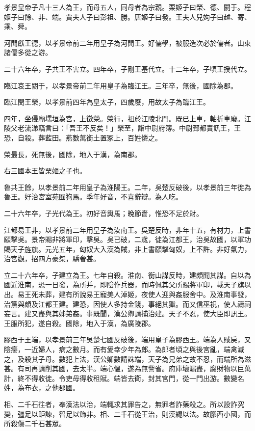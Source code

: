 
\begin{pinyinscope}
孝景皇帝子凡十三人為王，而母五人，同母者為宗親。栗姬子曰榮、德、閼于。程姬子曰餘、非、端。賈夫人子曰彭祖、勝。唐姬子曰發。王夫人兒姁子曰越、寄、乘、舜。

河閒獻王德，以孝景帝前二年用皇子為河閒王。好儒學，被服造次必於儒者。山東諸儒多從之游。

二十六年卒，子共王不害立。四年卒，子剛王基代立。十二年卒，子頃王授代立。

臨江哀王閼于，以孝景帝前二年用皇子為臨江王。三年卒，無後，國除為郡。

臨江閔王榮，以孝景前四年為皇太子，四歲廢，用故太子為臨江王。

四年，坐侵廟壖垣為宮，上徵榮。榮行，祖於江陵北門。既已上車，軸折車廢。江陵父老流涕竊言曰：「吾王不反矣！」榮至，詣中尉府簿。中尉郅都責訊王，王恐，自殺。葬藍田。燕數萬銜土置冢上，百姓憐之。

榮最長，死無後，國除，地入于漢，為南郡。

右三國本王皆栗姬之子也。

魯共王餘，以孝景前二年用皇子為淮陽王。二年，吳楚反破後，以孝景前三年徙為魯王。好治宮室苑囿狗馬。季年好音，不喜辭辯。為人吃。

二十六年卒，子光代為王。初好音輿馬；晚節嗇，惟恐不足於財。

江都易王非，以孝景前二年用皇子為汝南王。吳楚反時，非年十五，有材力，上書願擊吳。景帝賜非將軍印，擊吳。吳已破，二歲，徙為江都王，治吳故國，以軍功賜天子旌旗。元光五年，匈奴大入漢為賊，非上書願擊匈奴，上不許。非好氣力，治宮觀，招四方豪桀，驕奢甚。

立二十六年卒，子建立為王。七年自殺。淮南、衡山謀反時，建頗聞其謀。自以為國近淮南，恐一日發，為所并，即陰作兵器，而時佩其父所賜將軍印，載天子旗以出。易王死未葬，建有所說易王寵美人淖姬，夜使人迎與姦服舍中。及淮南事發，治黨與頗及江都王建。建恐，因使人多持金錢，事絕其獄。而又信巫祝，使人禱祠妄言。建又盡與其姊弟姦。事既聞，漢公卿請捕治建。天子不忍，使大臣即訊王。王服所犯，遂自殺。國除，地入于漢，為廣陵郡。

膠西于王端，以孝景前三年吳楚七國反破後，端用皇子為膠西王。端為人賊戾，又陰痿，一近婦人，病之數月。而有愛幸少年為郎。為郎者頃之與後宮亂，端禽滅之，及殺其子母。數犯上法，漢公卿數請誅端，天子為兄弟之故不忍，而端所為滋甚。有司再請削其國，去太半。端心慍，遂為無訾省。府庫壞漏盡，腐財物以巨萬計，終不得收徙。令吏毋得收租賦。端皆去衛，封其宮門，從一門出游。數變名姓，為布衣，之他郡國。

相、二千石往者，奉漢法以治，端輒求其罪告之，無罪者詐藥殺之。所以設詐究變，彊足以距諫，智足以飾非。相、二千石從王治，則漢繩以法。故膠西小國，而所殺傷二千石甚眾。


\end{pinyinscope}
